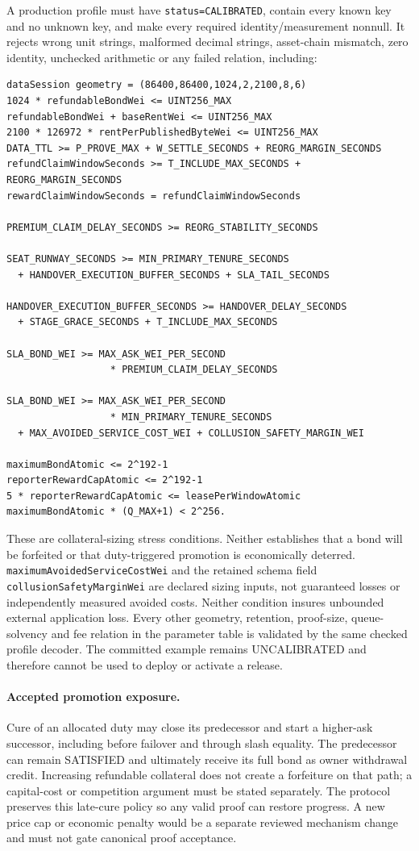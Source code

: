 \documentclass[a4paper,11pt]{article}
\newcommand{\code}[1]{\nolinkurl{#1}}
\begin{document}
A production profile must have \code{status=CALIBRATED}, contain every known key
and no unknown key, and make every required identity/measurement nonnull.  It
rejects wrong unit strings, malformed decimal strings, asset-chain mismatch,
zero identity, unchecked arithmetic or any failed relation, including:
\begin{verbatim}
dataSession geometry = (86400,86400,1024,2,2100,8,6)
1024 * refundableBondWei <= UINT256_MAX
refundableBondWei + baseRentWei <= UINT256_MAX
2100 * 126972 * rentPerPublishedByteWei <= UINT256_MAX
DATA_TTL >= P_PROVE_MAX + W_SETTLE_SECONDS + REORG_MARGIN_SECONDS
refundClaimWindowSeconds >= T_INCLUDE_MAX_SECONDS + REORG_MARGIN_SECONDS
rewardClaimWindowSeconds = refundClaimWindowSeconds

PREMIUM_CLAIM_DELAY_SECONDS >= REORG_STABILITY_SECONDS

SEAT_RUNWAY_SECONDS >= MIN_PRIMARY_TENURE_SECONDS
  + HANDOVER_EXECUTION_BUFFER_SECONDS + SLA_TAIL_SECONDS

HANDOVER_EXECUTION_BUFFER_SECONDS >= HANDOVER_DELAY_SECONDS
  + STAGE_GRACE_SECONDS + T_INCLUDE_MAX_SECONDS

SLA_BOND_WEI >= MAX_ASK_WEI_PER_SECOND
                  * PREMIUM_CLAIM_DELAY_SECONDS

SLA_BOND_WEI >= MAX_ASK_WEI_PER_SECOND
                  * MIN_PRIMARY_TENURE_SECONDS
  + MAX_AVOIDED_SERVICE_COST_WEI + COLLUSION_SAFETY_MARGIN_WEI

maximumBondAtomic <= 2^192-1
reporterRewardCapAtomic <= 2^192-1
5 * reporterRewardCapAtomic <= leasePerWindowAtomic
maximumBondAtomic * (Q_MAX+1) < 2^256.
\end{verbatim}
These are collateral-sizing stress conditions.  Neither establishes that a
bond will be forfeited or that duty-triggered promotion is economically
deterred.  \code{maximumAvoidedServiceCostWei} and the retained schema field
\code{collusionSafetyMarginWei} are declared sizing inputs, not guaranteed
losses or independently measured avoided costs.  Neither condition insures
unbounded external application loss.  Every other geometry, retention,
proof-size, queue-solvency and fee
relation in the parameter table is validated by the same checked profile
decoder.  The committed example remains UNCALIBRATED and therefore cannot be
used to deploy or activate a release.

\paragraph{Accepted promotion exposure.}
Cure of an allocated duty may close its predecessor and start a higher-ask
successor, including before failover and through slash equality.  The
predecessor can remain SATISFIED and ultimately receive its full bond as owner
withdrawal credit.  Increasing refundable collateral does not create a
forfeiture on that path; a capital-cost or competition argument must be stated
separately.  The protocol preserves this late-cure policy so any valid proof
can restore progress.  A new price cap or economic penalty would be a separate
reviewed mechanism change and must not gate canonical proof acceptance.
\end{document}
